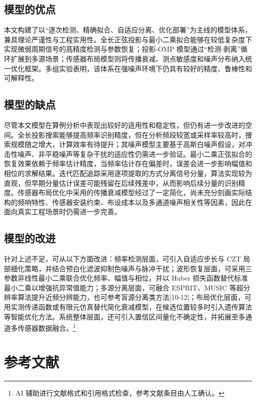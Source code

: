 \documentclass[UTF8,a4paper,12pt]{ctexart}
\numberwithin{figure}{section}
\numberwithin{table}{section}
\newcommand{\ainote}[1]{\footnote{\small #1}}
\begin{document}
\subsection{模型的优点}

本文构建了以“逐次检测、精确拟合、自适应分离、优化部署”为主线的模型体系，兼具理论严谨性与工程实用性。全长正弦投影与最小二乘拟合能够在较低复杂度下实现微弱周期信号的高精度检测与参数恢复；投影-OMP 模型通过“检测-剥离”循环扩展到多源场景；传感器布局模型则将传播衰减、测点敏感度和噪声分布纳入统一优化框架。多组实验表明，该体系在强噪声环境下仍具有较好的精度、鲁棒性和可解释性。

\subsection{模型的缺点}

尽管本文模型在算例分析中表现出较好的适用性和稳定性，但仍有进一步改进的空间。全长投影搜索能够提高频率识别精度，但在分析频段较宽或采样率较高时，搜索规模随之增大，计算效率有待提升；其噪声模型主要基于高斯白噪声假设，对冲击性噪声、非平稳噪声等复杂干扰的适应性仍需进一步验证。最小二乘正弦拟合的恢复效果依赖于频率估计精度，当频率估计存在偏差时，误差会进一步影响幅值和相位的求解结果。迭代匹配追踪采用逐项提取的方式分离信号分量，算法实现较为直观，但早期分量估计误差可能残留在后续残差中，从而影响后续分量的识别精度。传感器布局优化中采用的传播衰减模型经过了一定简化，尚未充分刻画实际结构的频响特性、传感器安装约束、布设成本以及多通道噪声相关性等因素，因此在面向真实工程场景时仍需进一步完善。

\subsection{模型的改进}

针对上述不足，可从以下方面改进：频率检测层面，可引入自适应步长与 CZT 局部细化策略，并结合预白化滤波抑制色噪声与脉冲干扰；波形恢复层面，可采用三参数非线性最小二乘联合优化频率、幅值与相位，并以 Huber 损失函数替代标准最小二乘以增强抗异常值能力；多源分离层面，可融合 ESPRIT、MUSIC 等超分辨率算法提升近频分辨能力，也可参考盲源分离类方法[10-12]；布局优化层面，可用实测传递函数或有限元仿真替代简化衰减模型，在候选位置较多时引入遗传算法等智能优化方法。系统整体层面，还可引入置信区间量化不确定性，并拓展至多通道多传感器数据融合。\ainote{AI 辅助进行文献格式和引用格式检查，参考文献条目由人工确认。}

\clearpage
\section{参考文献}
\end{document}
